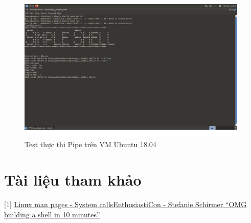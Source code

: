 \documentclass{article}
\begin{document}
\begin{figure}[H]
\centering
\includegraphics[width=0.98\textwidth]{virtual_machine_pipe.png}
\caption{Test thực thi Pipe trên VM Ubuntu 18.04}
\end{figure}

\section{Tài liệu tham khảo}
[1] \href{https://linux.die.net/man/2/}{Linux man pages - System calls}\newline
[2] \href{https://www.youtube.com/watch?v=k6TTj4C0LF0}{EnthusiastiCon - Stefanie Schirmer “OMG building a shell in 10 minutes”} \newline
\end{document}
